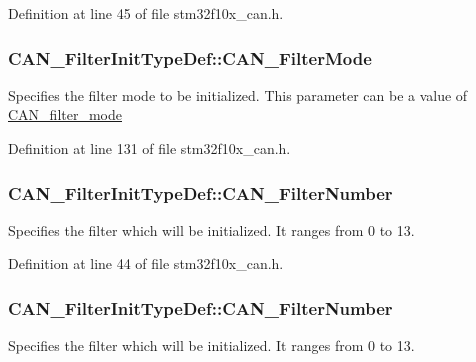Definition at line 45 of file stm32f10x\+\_\+can.\+h.

\subsubsection[{\texorpdfstring{C\+A\+N\+\_\+\+Filter\+Mode}{CAN_FilterMode}}]{ C\+A\+N\+\_\+\+Filter\+Init\+Type\+Def\+::\+C\+A\+N\+\_\+\+Filter\+Mode}\hypertarget{struct_c_a_n___filter_init_type_def_a7cfb23c48aad13a058c2619dbc062d8a}{}\label{struct_c_a_n___filter_init_type_def_a7cfb23c48aad13a058c2619dbc062d8a}
Specifies the filter mode to be initialized. This parameter can be a value of \hyperlink{group___c_a_n__filter__mode}{C\+A\+N\+\_\+filter\+\_\+mode} 

Definition at line 131 of file stm32f10x\+\_\+can.\+h.

\subsubsection[{\texorpdfstring{C\+A\+N\+\_\+\+Filter\+Number}{CAN_FilterNumber}}]{ C\+A\+N\+\_\+\+Filter\+Init\+Type\+Def\+::\+C\+A\+N\+\_\+\+Filter\+Number}\hypertarget{struct_c_a_n___filter_init_type_def_a5d757a1b31fccf8fa16a8d588c21fddb}{}\label{struct_c_a_n___filter_init_type_def_a5d757a1b31fccf8fa16a8d588c21fddb}
Specifies the filter which will be initialized. It ranges from 0 to 13. 

Definition at line 44 of file stm32f10x\+\_\+can.\+h.

\subsubsection[{\texorpdfstring{C\+A\+N\+\_\+\+Filter\+Number}{CAN_FilterNumber}}]{ C\+A\+N\+\_\+\+Filter\+Init\+Type\+Def\+::\+C\+A\+N\+\_\+\+Filter\+Number}\hypertarget{struct_c_a_n___filter_init_type_def_af94466e1138c2b4fe6a67cf556981193}{}\label{struct_c_a_n___filter_init_type_def_af94466e1138c2b4fe6a67cf556981193}
Specifies the filter which will be initialized. It ranges from 0 to 13. 


